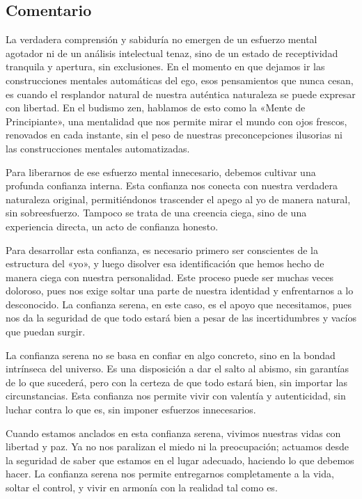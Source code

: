 \documentclass[
  a5paperpaper,
]{article}
\begin{document}
\hfill\break

\hypertarget{comentario-57}{%
\subsection{Comentario}\label{comentario-57}}

La verdadera comprensión y sabiduría no emergen de un esfuerzo mental
agotador ni de un análisis intelectual tenaz, sino de un estado de
receptividad tranquila y apertura, sin exclusiones. En el momento en que
dejamos ir las construcciones mentales automáticas del ego, esos
pensamientos que nunca cesan, es cuando el resplandor natural de nuestra
auténtica naturaleza se puede expresar con libertad. En el budismo zen,
hablamos de esto como la «Mente de Principiante», una mentalidad que nos
permite mirar el mundo con ojos frescos, renovados en cada instante, sin
el peso de nuestras preconcepciones ilusorias ni las construcciones
mentales automatizadas.

Para liberarnos de ese esfuerzo mental innecesario, debemos cultivar una
profunda confianza interna. Esta confianza nos conecta con nuestra
verdadera naturaleza original, permitiéndonos trascender el apego al yo
de manera natural, sin sobreesfuerzo. Tampoco se trata de una creencia
ciega, sino de una experiencia directa, un acto de confianza honesto.

Para desarrollar esta confianza, es necesario primero ser conscientes de
la estructura del «yo», y luego disolver esa identificación que hemos
hecho de manera ciega con nuestra personalidad. Este proceso puede ser
muchas veces doloroso, pues nos exige soltar una parte de nuestra
identidad y enfrentarnos a lo desconocido. La confianza serena, en este
caso, es el apoyo que necesitamos, pues nos da la seguridad de que todo
estará bien a pesar de las incertidumbres y vacíos que puedan surgir.

La confianza serena no se basa en confiar en algo concreto, sino en la
bondad intrínseca del universo. Es una disposición a dar el salto al
abismo, sin garantías de lo que sucederá, pero con la certeza de que
todo estará bien, sin importar las circunstancias. Esta confianza nos
permite vivir con valentía y autenticidad, sin luchar contra lo que es,
sin imponer esfuerzos innecesarios.

Cuando estamos anclados en esta confianza serena, vivimos nuestras vidas
con libertad y paz. Ya no nos paralizan el miedo ni la preocupación;
actuamos desde la seguridad de saber que estamos en el lugar adecuado,
haciendo lo que debemos hacer. La confianza serena nos permite
entregarnos completamente a la vida, soltar el control, y vivir en
armonía con la realidad tal como es.
\end{document}
